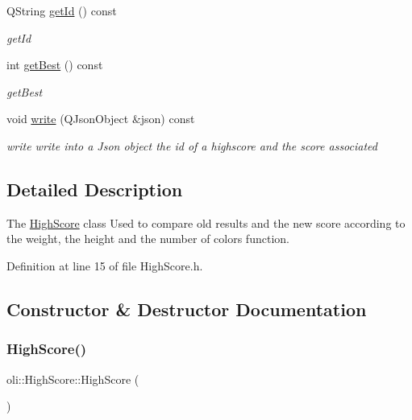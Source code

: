 \begin{DoxyCompactItemize}
Q\+String \hyperlink{classoli_1_1_high_score_ae0c11fdb5f35199aa785d6e66bfe8d03}{get\+Id} () const
\begin{DoxyCompactList}\small\item\em get\+Id \end{DoxyCompactList}\item 
int \hyperlink{classoli_1_1_high_score_a22d70136ee71bd13be26e30a423e0e7f}{get\+Best} () const
\begin{DoxyCompactList}\small\item\em get\+Best \end{DoxyCompactList}\item 
void \hyperlink{classoli_1_1_high_score_a644fb39e171f4176159168fed4b31753}{write} (Q\+Json\+Object \&json) const
\begin{DoxyCompactList}\small\item\em write write into a Json object the id of a highscore and the score associated \end{DoxyCompactList}\end{DoxyCompactItemize}


\subsection{Detailed Description}
The \hyperlink{classoli_1_1_high_score}{High\+Score} class Used to compare old results and the new score according to the weight, the height and the number of colors function. 

Definition at line 15 of file High\+Score.\+h.



\subsection{Constructor \& Destructor Documentation}
\hypertarget{classoli_1_1_high_score_a0d912d7674165be2873897b1d62ccccf}{}\label{classoli_1_1_high_score_a0d912d7674165be2873897b1d62ccccf} 
\subsubsection{\texorpdfstring{High\+Score()}{HighScore()}\hspace{0.1cm}{\footnotesize\ttfamily [1/3]}}
{\footnotesize\ttfamily oli\+::\+High\+Score\+::\+High\+Score (\begin{DoxyParamCaption}{ }\end{DoxyParamCaption})}



